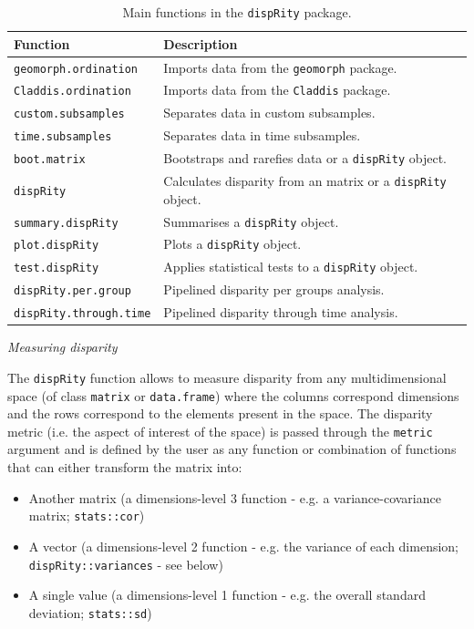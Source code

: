 \documentclass[12pt,letterpaper]{article}
\renewcommand{\subsection}[1]{%
\bigskip
\begin{center}
\begin{large}
\normalfont\itshape #1
\end{large}
\end{center}}
\newcommand{\disp}{\texttt{dispRity} }
\begin{document}
\begin{table}
    \begin{tabular}{ll}
        \hline
        Function & Description \\ 
        \hline
        \texttt{geomorph.ordination} & Imports data from the \texttt{geomorph} package. \\
        \texttt{Claddis.ordination} & Imports data from the \texttt{Claddis} package. \\
        \texttt{custom.subsamples} & Separates data in custom subsamples. \\
        \texttt{time.subsamples} & Separates data in time subsamples. \\
        \texttt{boot.matrix} & Bootstraps and rarefies data or a \disp object. \\
        \disp & Calculates disparity from an matrix or a \disp object. \\
        \texttt{summary.dispRity} & Summarises a \disp object. \\
        \texttt{plot.dispRity} & Plots a \disp object. \\
        \texttt{test.dispRity} & Applies statistical tests to a \disp object.\\
        \texttt{dispRity.per.group} & Pipelined disparity per groups analysis. \\
        \texttt{dispRity.through.time} & Pipelined disparity through time analysis. \\
        \hline
    \end{tabular}
    \caption{Main functions in the \disp package.}
    \label{Tab:main_fun}
\end{table}

\subsection{Measuring disparity}
The \disp function allows to measure disparity from any multidimensional space (of class \texttt{matrix} or \texttt{data.frame}) where the columns correspond dimensions and the rows correspond to the elements present in the space.
The disparity metric (i.e. the aspect of interest of the space) is passed through the \texttt{metric} argument and is defined by the user as any function or combination of functions that can either transform the matrix into:

\begin{itemize}
    \item Another matrix (a dimensions-level 3 function - e.g. a variance-covariance matrix; \texttt{stats::cor})
    \item A vector (a dimensions-level 2 function - e.g. the variance of each dimension; \texttt{dispRity::variances} - see below)
    \item A single value (a dimensions-level 1 function - e.g. the overall standard deviation; \texttt{stats::sd})
\end{itemize}
\end{document}
